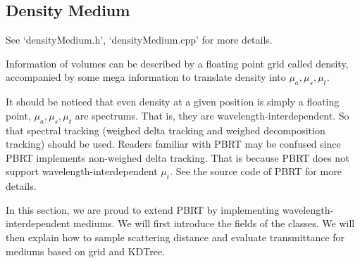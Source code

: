 \documentclass[acmtog]{acmart}
\begin{document}
\subsection{Density Medium}
See `densityMedium.h', `densityMedium.cpp' for more details.\par
Information of volumes can be described by a floating point grid called density, 
accompanied by some mega information to translate density into $\mu_a, \mu_s, \mu_t$.\par
It should be noticed that even density at a given position is simply a floating point, 
$\mu_a, \mu_s, \mu_t$ are spectrums.
That is, they are wavelength-interdependent.
So that spectral tracking (weighed delta tracking and weighed decomposition tracking) should be used.
Readers familiar with PBRT may be confused since PBRT implements non-weighed delta tracking.
That is because PBRT does not support wavelength-interdependent $\mu_t$.
See the source code of PBRT for more details.\par
In this section, we are proud to extend PBRT by implementing wavelength-interdependent mediums.
We will first introduce the fields of the classes.
We will then explain how to sample scattering distance and evaluate transmittance for mediums based on grid and KDTree.
\end{document}
